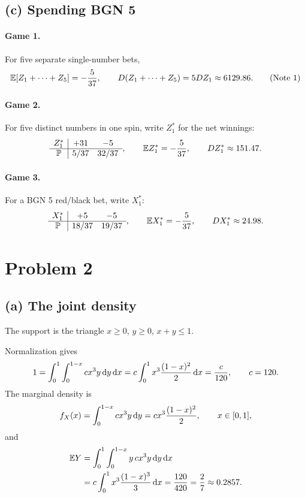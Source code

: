 \documentclass[11pt,a4paper]{article}
\begin{document}
\subsection*{(c) Spending BGN 5}
\paragraph{Game 1.} For five separate single-number bets,
\[
\mathbb {E}[Z_1+\cdots+Z_5]=-\frac5{37},\qquad
D(Z_1+\cdots+Z_5)=5DZ_1\approx6129.86.\tag{Note 1}
\]
\paragraph{Game 2.} For five distinct numbers in one spin, write $Z_1^*$ for the net winnings:
\[
\begin{array}{c|cc}Z_1^*&+31&-5\\\hline\mathbb P&5/37&32/37\end{array},
\qquad\mathbb {E} Z_1^*=-\frac5{37},\qquad DZ_1^*\approx151.47.
\]
\paragraph{Game 3.} For a BGN 5 red/black bet, write $X_1^*$:
\[
\begin{array}{c|cc}X_1^*&+5&-5\\\hline\mathbb P&18/37&19/37\end{array},
\qquad\mathbb {E} X_1^*=-\frac5{37},\qquad DX_1^*\approx24.98.
\]

\section*{Problem 2}
\subsection*{(a) The joint density}
The support is the triangle $x\ge0$, $y\ge0$, $x+y\le1$.
\begin{center}
\end{center}
Normalization gives
\[
1=\int_0^1\int_0^{1-x}cx^3y\, \mathrm{d} y\, \mathrm{d} x
=c\int_0^1x^3\frac{(1-x)^2}2\, \mathrm{d} x=\frac c{120},
\qquad c=120.
\]
The marginal density is
\[
f_X(x)=\int_0^{1-x}cx^3y\, \mathrm{d} y=cx^3\frac{(1-x)^2}2,
\qquad x\in[0,1],
\]
and
\begin{align*}
\mathbb {E} Y&=\int_0^1\int_0^{1-x}y\,cx^3y\, \mathrm{d} y\, \mathrm{d} x\\
&=c\int_0^1x^3\frac{(1-x)^3}3\, \mathrm{d} x
=\frac{120}{420}=\frac27\approx0.2857.
\end{align*}
\end{document}

